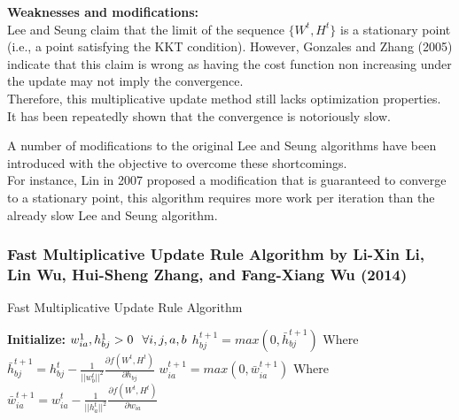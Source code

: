 \documentclass[aspectratio=169]{beamer}
\begin{document}
\begin{frame}
    \textbf{Weaknesses and modifications:}\\
    Lee and Seung claim that the limit of the sequence $\{W^{t}, H^{t}\}$ is a 
    stationary point (i.e., a point satisfying the KKT condition). However, Gonzales and Zhang (2005)
    indicate that this claim is wrong as having  the cost function non increasing under the update 
    may not imply the convergence.\\
    Therefore, this multiplicative update method still lacks optimization properties.\\
    It has been repeatedly shown that the convergence is notoriously slow.
    
    A number of modifications to the original Lee and Seung algorithms have been
    introduced with the objective to overcome these shortcomings.\\

    For instance, Lin in 2007 proposed a modification that is guaranteed to converge to a stationary point,
    this algorithm requires more work per iteration than the already slow Lee and Seung algorithm.
\end{frame}
\begin{frame}
    \begin{tcolorbox}[fit,width=\textwidth,height=.85\textheight,size=minimal,colback=white,fit algorithm=fontsize,colframe=white]
\frametitle{Fast Multiplicative Update Rule Algorithm by Li-Xin Li, Lin Wu, Hui-Sheng Zhang, and Fang-Xiang Wu (2014)}
\begin{algorithm}[H]
    \caption{Fast Multiplicative Update Rule Algorithm}
        \textbf{Initialize:} $w_{ia}^{1}, h_{bj}^{1} > 0 \hspace{0.1in}\forall i,j,a,b$\;
         {
        {$h_{bj}^{t+1} = max(0, \bar{h}_{bj}^{t+1})$\;
         Where \;
         $\bar{h}_{bj}^{t+1} = h_{bj}^{t} - \frac{1}{||w_{b}^{t}||^{2}}\frac{\partial f(W^{t},H^{t})}{\partial h_{bj}}$\;
        }
        {$w_{ia}^{t+1} = max(0, \bar{w}_{ia}^{t+1})$\;
         Where \;
         $\bar{w}_{ia}^{t+1} = w_{ia}^{t} - \frac{1}{||h_{a}^{t}||^{2}}\frac{\partial f(W^{t},H^{t})}{\partial w_{ia}}$\;
        }
        }
\end{algorithm}
\end{tcolorbox}
\end{frame}
\end{document}

